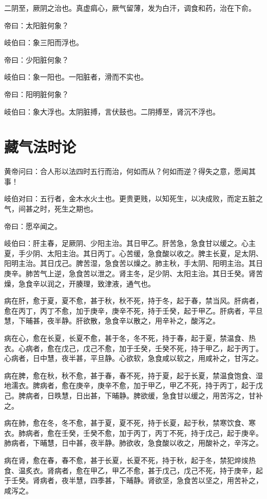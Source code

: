 \documentclass{article}%
\begin{document}
二阴至，厥阴之治也。真虚㾓心，厥气留薄，发为白汗，调食和药，治在下俞。

帝曰：太阳脏何象？

岐伯曰：象三阳而浮也。

帝曰：少阳脏何象？

岐伯曰：象一阳也。一阳脏者，滑而不实也。

帝曰：阳明脏何象？

岐伯曰：象大浮也。太阴脏搏，言伏鼓也。二阴搏至，肾沉不浮也。
\section{藏气法时论}
黄帝问曰：合人形以法四时五行而治，何如而从？何如而逆？得失之意，愿闻其事！

岐伯对曰：五行者，金木水火土也。更贵更贱，以知死生，以决成败，而定五脏之气，间甚之时，死生之期也。

帝曰：愿卒闻之。

岐伯曰：肝主春，足厥阴、少阳主治。其日甲乙。肝苦急，急食甘以缓之。心主夏，手少阴、太阳主治。其日丙丁。心苦缓，急食酸以收之。脾主长夏，足太阴、阳明主治。其日戊己。脾苦湿，急食苦以燥之。肺主秋，手太阴、阳明主治。其日庚辛。肺苦气上逆，急食苦以泄之。肾主冬，足少阴、太阳主治。其日壬癸。肾苦燥，急食辛以润之，开腠理，致津液，通气也。

病在肝，愈于夏，夏不愈，甚于秋，秋不死，持于冬，起于春，禁当风。肝病者，愈在丙丁，丙丁不愈，加于庚辛，庚辛不死，持于壬癸，起于甲乙。肝病者，平旦慧，下晡甚，夜半静。肝欲散，急食辛以散之，用辛补之，酸泻之。

病在心，愈在长夏，长夏不愈，甚于冬，冬不死，持于春，起于夏，禁温食、热衣。心病者，愈在戊己，戊己不愈，加于壬癸，壬癸不死，持于甲乙，起于丙丁。心病者，日中慧，夜半甚，平旦静。心欲软，急食咸以软之，用咸补之，甘泻之。

病在脾，愈在秋，秋不愈，甚于春，春不死，持于夏，起于长夏，禁温食饱食、湿地濡衣。脾病者，愈在庚辛，庚辛不愈，加于甲乙，甲乙不死，持于丙丁，起于戊己。脾病者，日昳慧，日出甚，下晡静。脾欲缓，急食甘以缓之，用苦泻之，甘补之。

病在肺，愈在冬，冬不愈，甚于夏，夏不死，持于长夏，起于秋，禁寒饮食、寒衣。肺病者，愈在壬癸，壬癸不愈，加于丙丁，丙丁不死，持于戊己，起于庚辛。肺病者，下晡慧，日中甚，夜半静。肺欲收，急食酸以收之，用酸补之，辛泻之。

病在肾，愈在春，春不愈，甚于长夏，长夏不死，持于秋，起于冬，禁犯焠㶼热食、温炙衣。肾病者，愈在甲乙，甲乙不愈，甚于戊己，戊己不死，持于庚辛，起于壬癸。肾病者，夜半慧，四季甚，下晡静。肾欲坚，急食苦以坚之，用苦补之，咸泻之。
\end{document}
